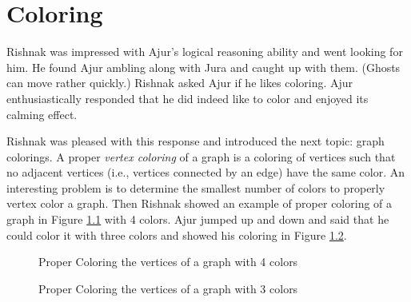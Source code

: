 \chapter{Coloring}
Rishnak  was impressed with Ajur's logical reasoning ability and went looking for him. He found Ajur ambling along with Jura and caught up with them. (Ghosts can move rather quickly.) Rishnak asked Ajur if he likes coloring.  Ajur enthusiastically responded that he did indeed like to color and enjoyed its calming effect.

Rishnak was pleased with this response and introduced the next topic: graph colorings. A proper \emph{vertex coloring} of a graph is a coloring of vertices such that no adjacent vertices (i.e., vertices connected by an edge) have the same color. An interesting problem is to determine the smallest number of colors to properly vertex color a graph. 
Then Rishnak showed an example of proper coloring of a graph in Figure \ref{10g1} with 4 colors. Ajur jumped up and down and said that he could color it with three colors and showed his coloring in Figure \ref{10g2}.
\begin{figure}[h]
\begin{center}
\caption{ Proper Coloring the vertices of a graph with 4 colors}\label{10g1}
\end{center}
\end{figure}

\begin{figure}[h]
\begin{center}
\caption{ Proper Coloring the vertices of a graph with 3 colors}\label{10g2}
\end{center}
\end{figure}


